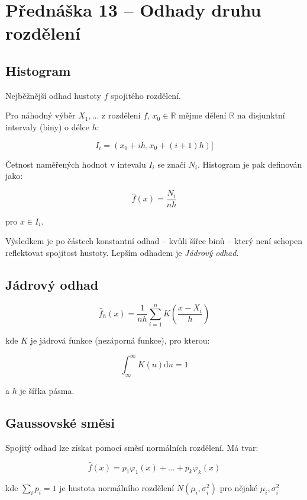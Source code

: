 \section{Přednáška 13 -- Odhady druhu rozdělení}

\subsection{Histogram}

Nejběžnější odhad hustoty $f$ spojitého rozdělení.

Pro náhodný výběr $X_1, \dots$ z rozdělení $f$, $x_0 \in \mathbb{R}$ mějme dělení $\mathbb{R}$ na disjunktní intervaly (biny) o délce $h$:

$$
    I_i = (x_0 + ih, x_0 + (i+1)h)]
$$

Četnost naměřených hodnot v intevalu $I_i$ se značí $N_i$.
Histogram je pak definován jako:

$$
    \hat{f}(x) = \frac{N_i}{nh}
$$

pro $x \in I_i$.


Výsledkem je po částech konstantní odhad -- kvůli šířce binů -- který není schopen reflektovat spojitost hustoty.
Lepším odhadem je \textit{Jádrový odhad}.

\subsection{Jádrový odhad}

$$
    \hat{f}_h(x) = \frac{1}{nh} \sum_{i=1}^{n}{K(\frac{x-X_i}{h})}
$$

kde $K$ je jádrová funkce (nezáporná funkce), pro kterou:

$$
    \int_{\infty}^{\infty}{K(u)\textrm{d}u = 1}
$$

a $h$ je šířka pásma.

\subsection{Gaussovské směsi}

Spojitý odhad lze získat pomocí směsí normálních rozdělení.
Má tvar:

$$
    \hat{f}(x) = p_1\varphi_1(x)+\dots+p_k\varphi_k(x)
$$

kde $\sum_{i}{p_i} = 1$ je hustota normálního rozdělení $N(\mu_i, \sigma_{i}^{2})$ pro nějaké $\mu_i, \sigma_{i}^{2}$


